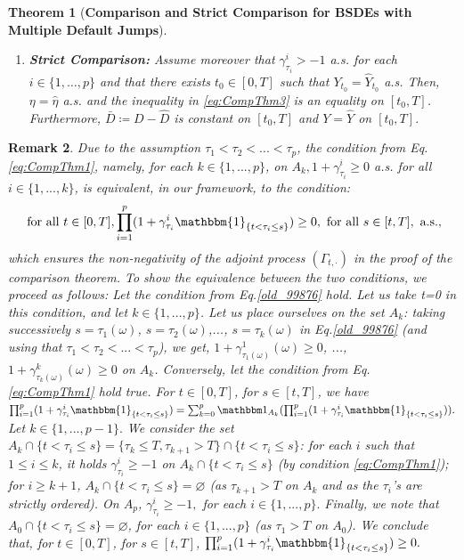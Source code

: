 \documentclass[11pt,a4paper]{article}
\numberwithin{equation}{section}
\theoremstyle{newPlain}
\newtheorem{theorem}{Theorem}[section]
\theoremstyle{newDefinition}
\theoremstyle{newRemark}
\newtheorem{remark}[theorem]{Remark}
\begin{document}
{\begin{theorem}[\textbf{Comparison and Strict Comparison for BSDEs with Multiple Default Jumps}]
\begin{enumerate}[label=(\roman*)]
\begin{equation}
            g(t,\hat{Y}_t,\hat{Z}_t,\hat{K}_t^1,\ldots,\hat{K}_t^p)\ge \hat{g}(t,\hat{Y}_t,\hat{Z}_t,\hat{K}_t^1,\ldots,\hat{K}_t^p)
        \end{equation}
        for $t\in[0,T]$, $dP\otimes dt$-a.e.
        We then have $Y_t\ge\hat{Y}_t$ for all $t\in[0,T]$ a.s.
        \item \textbf{Strict Comparison:} Assume moreover that   $\gamma_{\tau_i}^i>-1$ a.s. for each $i\in\{1,\ldots,p\}$ and  that there exists $t_0\in [0,T]$ such that  $Y_{t_0}=\hat{Y}_{t_0}$ a.s.  Then, $\eta=\hat{\eta}$ a.s. and the inequality in \eqref{eq:CompThm3} is an equality on $[t_0,T]$. Furthermore, $\bar{D}\coloneqq D - \hat{D}$ is constant on $[t_0,T]$ and $Y =\hat{Y}$ on $[t_0,T]$.
    \end{enumerate}
\end{theorem}
\begin{remark}\label{remark:CompThm997}
Due to the assumption $\tau_1<\tau_2<...<\tau_p$, the condition from Eq. \eqref{eq:CompThm1}, namely,  for each  $k\in\{1,...,p\}$,   on  $A_k, 1+\gamma_{\tau_i}^i\ge0$  a.s.  for all  $i\in\{1,...,k\}$, is equivalent, in our framework, to the condition:
\begin{equation}\label{old_99876}
\text{ for all } t\in[0,T], \prod_{i=1}^p(1+\gamma_{\tau_i}^i\mathbbm{1}_{\{t<\tau_i\le s\}})\ge0, \text{ for all } s\in[t,T], \text{ a.s.},
\end{equation}
  which ensures the non-negativity of the adjoint process $(\Gamma_{t,\cdot})$ in the proof of the comparison theorem.   To show the equivalence between the two conditions, we proceed as follows: Let the condition from Eq.\eqref{old_99876} hold. Let us take t=0 in this condition, and let $k\in\{1,...,p\}$. Let us place ourselves on the set $A_k$: taking successively $s=\tau_1(\omega)$, $s=\tau_2(\omega)$,..., $s= \tau_k(\omega)$ in Eq.\eqref{old_99876} (and using that  $\tau_1<\tau_2<...<\tau_p$), we get,  $1+\gamma^1_{\tau_1(\omega)}(\omega)\geq 0$, ..., $1+\gamma^k_{\tau_k(\omega)}(\omega)\geq 0$ on $A_k$. Conversely, let the condition from Eq. \eqref{eq:CompThm1} hold true. For $t\in[0,T]$,   for $s\in[t,T]$, we have $\prod_{i=1}^p(1+\gamma_{\tau_i}^i\mathbbm{1}_{\{t<\tau_i\le s\}})=\sum_{k=0}^p \mathbbm 1_{A_k} (\prod_{i=1}^p(1+\gamma_{\tau_i}^i\mathbbm{1}_{\{t<\tau_i\le s\}})).$ Let $k\in\{1,...,p-1\}. $ We consider the set  $A_k\cap \{t<\tau_i\leq s\}= \{\tau_k\leq T,\tau_{k+1}> T\}\cap \{t<\tau_i\leq s\}$: for each $i$ such that  $1 \leq i\leq k$, it holds $\gamma_{\tau_i}^i\geq -1$ on $A_k\cap \{t<\tau_i\leq s\}$ (by condition  \eqref{eq:CompThm1}); for $i\geq k+1$, $A_k\cap \{t<\tau_i\leq s\}=\varnothing$ (as $\tau_{k+1}>T$ on $A_k$ and as the $\tau_i$'s are strictly ordered). On $A_p$, $\gamma_{\tau_i}^i\geq -1,$ for each $i\in\{1,...,p\}.$  Finally, we note that $A_0\cap \{t<\tau_i\leq s\}=\varnothing$, for each $i\in\{1,...,p\}$ (as $\tau_1>T$ on $A_0$).    We  conclude that, for $t\in[0,T]$,   for  $s\in[t,T]$,  $\prod_{i=1}^p(1+\gamma_{\tau_i}^i\mathbbm{1}_{\{t<\tau_i\le s\}})\geq 0.$  

\end{remark}}
\end{document}
